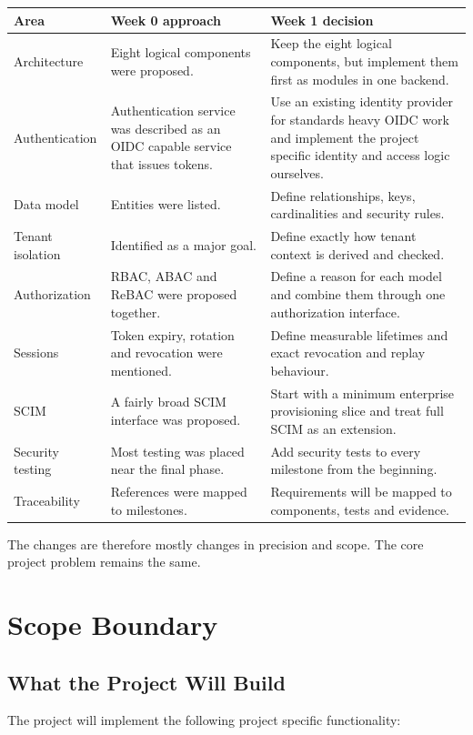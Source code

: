 \documentclass[11pt,a4paper]{article}
\begin{document}
\begin{longtable}{p{}p{}p{}}
\toprule
Area & Week 0 approach & Week 1 decision \\
\midrule
Architecture & Eight logical components were proposed. & Keep the eight logical components, but implement them first as modules in one backend. \\
Authentication & Authentication service was described as an OIDC capable service that issues tokens. & Use an existing identity provider for standards heavy OIDC work and implement the project specific identity and access logic ourselves. \\
Data model & Entities were listed. & Define relationships, keys, cardinalities and security rules. \\
Tenant isolation & Identified as a major goal. & Define exactly how tenant context is derived and checked. \\
Authorization & RBAC, ABAC and ReBAC were proposed together. & Define a reason for each model and combine them through one authorization interface. \\
Sessions & Token expiry, rotation and revocation were mentioned. & Define measurable lifetimes and exact revocation and replay behaviour. \\
SCIM & A fairly broad SCIM interface was proposed. & Start with a minimum enterprise provisioning slice and treat full SCIM as an extension. \\
Security testing & Most testing was placed near the final phase. & Add security tests to every milestone from the beginning. \\
Traceability & References were mapped to milestones. & Requirements will be mapped to components, tests and evidence. \\
\bottomrule
\end{longtable}

The changes are therefore mostly changes in precision and scope. The core project problem remains the same.

\section{Scope Boundary}

\subsection{What the Project Will Build}

The project will implement the following project specific functionality:
\end{document}
